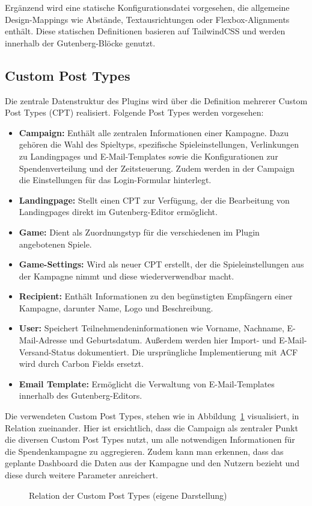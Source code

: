 Ergänzend wird eine statische Konfigurationsdatei vorgesehen, die allgemeine Design-Mappings wie Abstände, Textausrichtungen oder Flexbox-Alignments enthält.
Diese statischen Definitionen basieren auf TailwindCSS und werden innerhalb der Gutenberg-Blöcke genutzt.
\newpage
\subsection{Custom Post Types}
Die zentrale Datenstruktur des Plugins wird über die Definition mehrerer Custom Post Types (\gls{CPT}) realisiert.
Folgende Post Types werden vorgesehen:

\begin{itemize}
    \item \textbf{Campaign:} Enthält alle zentralen Informationen einer Kampagne.
    Dazu gehören die Wahl des Spieltyps, spezifische Spieleinstellungen, Verlinkungen zu Landingpages und E-Mail-Templates sowie die Konfigurationen zur Spendenverteilung und der Zeitsteuerung.
    Zudem werden in der Campaign die Einstellungen für das Login-Formular hinterlegt.

    \item \textbf{Landingpage:} Stellt einen CPT zur Verfügung, der die Bearbeitung von Landingpages direkt im Gutenberg-Editor ermöglicht.
    \item \textbf{Game:} Dient als Zuordnungstyp für die verschiedenen im Plugin angebotenen Spiele.
    \item \textbf{Game-Settings:} Wird als neuer CPT erstellt, der die Spieleinstellungen aus der Kampagne nimmt und diese wiederverwendbar macht.
    \item \textbf{Recipient:} Enthält Informationen zu den begünstigten Empfängern einer Kampagne, darunter Name, Logo und Beschreibung.
    \item \textbf{User:} Speichert Teilnehmendeninformationen wie Vorname, Nachname, E-Mail-Adresse und Geburtsdatum.
    Außerdem werden hier Import- und E-Mail-Versand-Status dokumentiert.
    Die ursprüngliche Implementierung mit ACF wird durch Carbon Fields ersetzt.
    \item \textbf{Email Template:} Ermöglicht die Verwaltung von E-Mail-Templates innerhalb des Gutenberg-Editors.
\end{itemize}

Die verwendeten Custom Post Types, stehen wie in Abbildung~\ref{fig:datenmodell} visualisiert, in Relation zueinander.
Hier ist ersichtlich, dass die Campaign als zentraler Punkt die diversen Custom Post Types nutzt, um alle notwendigen Informationen für die Spendenkampagne zu aggregieren.
Zudem kann man erkennen, dass das geplante Dashboard die Daten aus der Kampagne und den Nutzern bezieht und diese durch weitere Parameter anreichert.
\begin{figure}[H]
    \centering
    
    \caption{Relation der Custom Post Types (eigene Darstellung)}
    \label{fig:datenmodell}
\end{figure}


